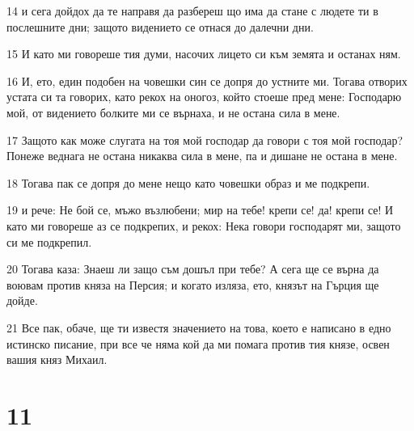 \par 14 и сега дойдох да те направя да разбереш що има да стане с людете ти в послешните дни; защото видението се отнася до далечни дни.
\par 15 И като ми говореше тия думи, насочих лицето си към земята и останах ням.
\par 16 И, ето, един подобен на човешки син се допря до устните ми. Тогава отворих устата си та говорих, като рекох на оногоз, който стоеше пред мене: Господарю мой, от видението болките ми се върнаха, и не остана сила в мене.
\par 17 Защото как може слугата на тоя мой господар да говори с тоя мой господар? Понеже веднага не остана никаква сила в мене, па и дишане не остана в мене.
\par 18 Тогава пак се допря до мене нещо като човешки образ и ме подкрепи.
\par 19 и рече: Не бой се, мъжо възлюбени; мир на тебе! крепи се! да! крепи се! И като ми говореше аз се подкрепих, и рекох: Нека говори господарят ми, защото си ме подкрепил.
\par 20 Тогава каза: Знаеш ли защо съм дошъл при тебе? А сега ще се върна да воювам против княза на Персия; и когато изляза, ето, князът на Гърция ще дойде.
\par 21 Все пак, обаче, ще ти известя значението на това, което е написано в едно истинско писание, при все че няма кой да ми помага против тия князе, освен вашия княз Михаил.

\chapter{11}

